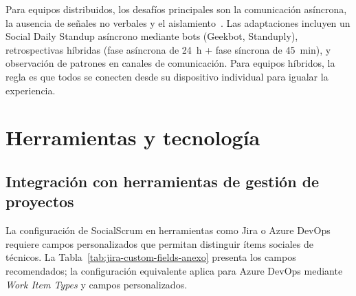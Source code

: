 Para equipos distribuidos, los desafíos principales son la comunicación asíncrona, la ausencia de señales no verbales y el aislamiento~\cite{wilson2006trust, noll2020motivation}. Las adaptaciones incluyen un Social Daily Standup asíncrono mediante bots (Geekbot, Standuply), retrospectivas híbridas (fase asíncrona de 24~h + fase síncrona de 45~min), y observación de patrones en canales de comunicación. Para equipos híbridos, la regla es que todos se conecten desde su dispositivo individual para igualar la experiencia.

\section{Herramientas y tecnología}

\subsection{Integración con herramientas de gestión de proyectos}

La configuración de SocialScrum en herramientas como Jira o Azure DevOps requiere campos personalizados que permitan distinguir ítems sociales de técnicos. La Tabla~\ref{tab:jira-custom-fields-anexo} presenta los campos recomendados; la configuración equivalente aplica para Azure DevOps mediante \textit{Work Item Types} y campos personalizados.

\begingroup
\scriptsize
\renewcommand{\arraystretch}{1.3}
\setlength{\tabcolsep}{4pt}
\setlength{\LTleft}{0pt}
\setlength{\LTright}{0pt}


